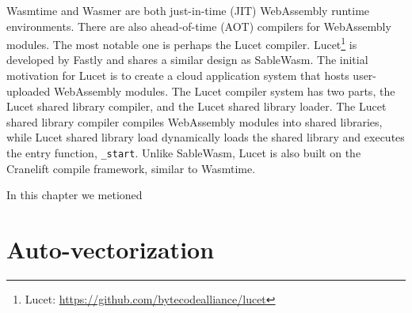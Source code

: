 Wasmtime and Wasmer are both just-in-time (JIT) WebAssembly runtime environments. There are also ahead-of-time (AOT) compilers for WebAssembly modules. The most notable one is perhaps the Lucet compiler. Lucet\footnote{Lucet: \url{https://github.com/bytecodealliance/lucet}} is developed by Fastly and shares a similar design as SableWasm. The initial motivation for Lucet is to create a cloud application system that hosts user-uploaded WebAssembly modules. The Lucet compiler system has two parts, the Lucet shared library compiler, and the Lucet shared library loader. The Lucet shared library compiler compiles WebAssembly modules into shared libraries, while Lucet shared library load dynamically loads the shared library and executes the entry function, \texttt{\_start}. Unlike SableWasm, Lucet is also built on the Cranelift compile framework, similar to Wasmtime.

In this chapter we metioned

\section{Auto-vectorization}